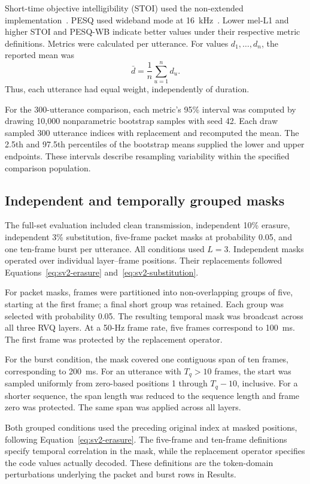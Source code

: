 Short-time objective intelligibility (STOI) used the non-extended implementation~\cite{stoi}. PESQ used wideband mode at 16~kHz~\cite{pesq}. Lower mel-L1 and higher STOI and PESQ-WB indicate better values under their respective metric definitions. Metrics were calculated per utterance. For values $d_1,\ldots,d_n$, the reported mean was
\begin{equation}
 \bar d=\frac{1}{n}\sum_{u=1}^{n}d_u.
 \label{eq:sv2-mean}
\end{equation}
Thus, each utterance had equal weight, independently of duration.

For the 300-utterance comparison, each metric's 95\% interval was computed by drawing 10,000 nonparametric bootstrap samples with seed 42. Each draw sampled 300 utterance indices with replacement and recomputed the mean. The 2.5th and 97.5th percentiles of the bootstrap means supplied the lower and upper endpoints. These intervals describe resampling variability within the specified comparison population.

\subsection{Independent and temporally grouped masks}
The full-set evaluation included clean transmission, independent 10\% erasure, independent 3\% substitution, five-frame packet masks at probability 0.05, and one ten-frame burst per utterance. All conditions used $L=3$. Independent masks operated over individual layer--frame positions. Their replacements followed Equations~\ref{eq:sv2-erasure} and~\ref{eq:sv2-substitution}.

For packet masks, frames were partitioned into non-overlapping groups of five, starting at the first frame; a final short group was retained. Each group was selected with probability 0.05. The resulting temporal mask was broadcast across all three RVQ layers. At a 50-Hz frame rate, five frames correspond to 100~ms. The first frame was protected by the replacement operator.

For the burst condition, the mask covered one contiguous span of ten frames, corresponding to 200~ms. For an utterance with $T_q>10$ frames, the start was sampled uniformly from zero-based positions 1 through $T_q-10$, inclusive. For a shorter sequence, the span length was reduced to the sequence length and frame zero was protected. The same span was applied across all layers.

Both grouped conditions used the preceding original index at masked positions, following Equation~\ref{eq:sv2-erasure}. The five-frame and ten-frame definitions specify temporal correlation in the mask, while the replacement operator specifies the code values actually decoded. These definitions are the token-domain perturbations underlying the packet and burst rows in Results.

